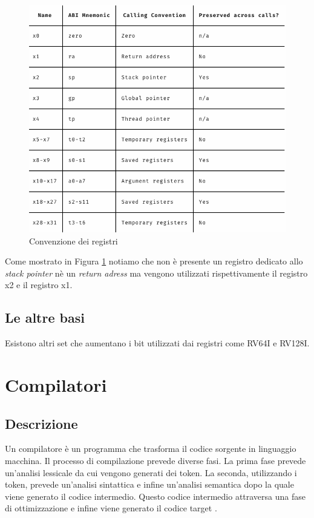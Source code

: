 \documentclass[12pt, a4paper]{report}
\begin{document}
\begin{figure}[h!]
\centering
	\includegraphics[scale=0.3]{ABI-RISC-V}
	\caption{Convenzione dei registri}
	\label{Fig:ConvenzioneRegistri}
\end{figure}

Come mostrato in Figura \ref{Fig:ConvenzioneRegistri} notiamo che non è presente un registro dedicato allo \textit{stack pointer} nè un \textit{return adress} ma vengono utilizzati rispettivamente il registro x2 e il registro x1.


\section{Le altre basi}
Esistono altri set che aumentano i bit utilizzati dai registri come RV64I e RV128I. 





\chapter{Compilatori}
\section{Descrizione}
Un compilatore è un programma che trasforma il codice sorgente in linguaggio macchina. Il processo di compilazione prevede diverse fasi. La prima fase prevede un'analisi lessicale da cui vengono generati dei token. La seconda, utilizzando i token, prevede un'analisi sintattica e infine un'analisi semantica dopo la quale viene generato il codice intermedio. Questo codice intermedio attraversa una fase di ottimizzazione e infine viene generato il codice target \cite{GCC} \cite{LLVM}.
\end{document}
